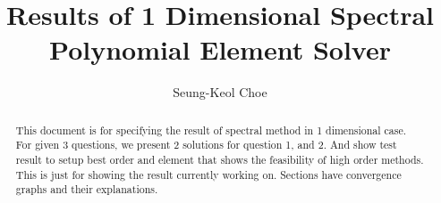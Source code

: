 \documentclass[11pt,letterpaper]{article}
\begin{document}
\title{{\bfseries Results of 1 Dimensional Spectral Polynomial Element Solver}}

\author{Seung-Keol Choe}
\renewcommand{\today}{Sep 21th, 2003}

\maketitle

\begin{abstract}
This document is for specifying the result of spectral method in 1
dimensional case. For given 3 questions, we present 2 solutions
for question 1, and 2. And show test result to setup best order
and element that shows the feasibility of high order methods. This
is just for showing the result currently working on. Sections have
convergence graphs and their explanations.
\end{abstract}





\clearpage

\end{document}

